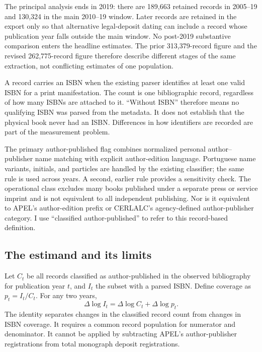 \documentclass[11pt]{article}
\begin{document}
The principal analysis ends in 2019: there are 189,663 retained records in 2005--19 and 130,324 in the main 2010--19 window. Later records are retained in the export only so that alternative legal-deposit dating can include a record whose publication year falls outside the main window. No post-2019 substantive comparison enters the headline estimates. The prior 313,379-record figure and the revised 262,775-record figure therefore describe different stages of the same extraction, not conflicting estimates of one population.

A record carries an ISBN when the existing parser identifies at least one valid ISBN for a print manifestation. The count is one bibliographic record, regardless of how many ISBNs are attached to it. ``Without ISBN'' therefore means no qualifying ISBN was parsed from the metadata. It does not establish that the physical book never had an ISBN. Differences in how identifiers are recorded are part of the measurement problem.

The primary author-published flag combines normalized personal author--publisher name matching with explicit author-edition language. Portuguese name variants, initials, and particles are handled by the existing classifier; the same rule is used across years. A second, earlier rule provides a sensitivity check. The operational class excludes many books published under a separate press or service imprint and is not equivalent to all independent publishing. Nor is it equivalent to APEL's author-edition prefix or CERLALC's agency-defined author-publisher category. I use ``classified author-published'' to refer to this record-based definition.

\subsection{The estimand and its limits}

Let $C_t$ be all records classified as author-published in the observed bibliography for publication year $t$, and $I_t$ the subset with a parsed ISBN. Define coverage as $p_t=I_t/C_t$. For any two years,
\begin{equation}\label{eq:identity}
\Delta\log I_t=\Delta\log C_t+\Delta\log p_t.
\end{equation}
The identity separates changes in the classified record count from changes in ISBN coverage. It requires a common record population for numerator and denominator. It cannot be applied by subtracting APEL's author-publisher registrations from total monograph deposit registrations.
\end{document}
